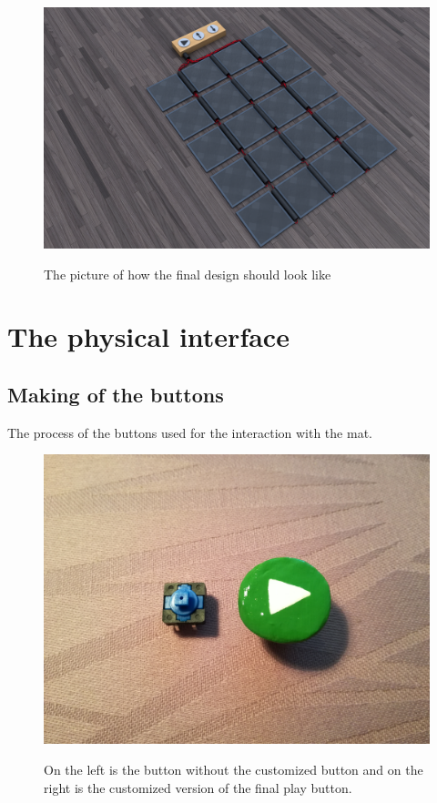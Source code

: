 \begin{figure}[H]
	\centering
	\includegraphics[width=0.7\linewidth]{figure/Design/finaldesign}
	\label{fig:finaldesign}
	\caption{The picture of how the final design should look like}
	
\end{figure}


\section{The physical interface}

\subsection{Making of the buttons}

The process of the buttons used for the interaction with the mat.

\begin{figure}[H]
	\centering
	\includegraphics[width=0.7\linewidth]{figure/Design/buttons}
	\label{fig:buttons}
	\caption{On the left is the button without the customized button and on the right is the customized version of the final play button.}
	
\end{figure}

